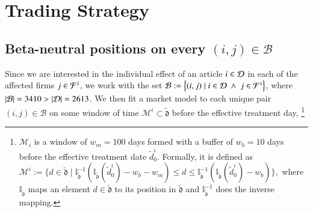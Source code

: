 \section{Trading Strategy}

\subsection{Beta-neutral positions on every $(i,j)\in\mathcal B$}
Since we are interested in the individual effect of an article $i\in\mathcal{D}$ in each of the affected firms $j\in\mathcal{F}^i$, we work with the set
$
\mathcal{B}:=\left\{(i,j) \mid i\in \mathcal{D} ~\wedge~j\in \mathcal{F}^i \right\}
$, where $\left|\mathcal{B}\right|=3410>\left|\mathcal{D}\right|=2613$. 
We then fit a market model to each unique pair $(i,j)\in \mathcal{B}$
on some window of time $\mathcal{M}^i\subset \tilde{\mathfrak{d}}$ before the effective treatment day,%
\footnote{$\mathcal M_i$ is a window of $w_m=100$ days formed with a buffer of $w_b=10$ days  before the effective treatment date $\tilde d_0^i$. Formally, it is defined as   
$
\mathcal{M}^i := 
\{
d\in \tilde{\mathfrak{d}}
\mid 
\mathbb{I}^{-1}_{\tilde{\mathfrak{d}}} 
(
\mathbb{I}_{\tilde{\mathfrak{d}}} (\tilde{d}_0^i) - {w}_b - {w}_m 
)
\leq d \leq 
\mathbb{I}^{-1}_{\tilde{\mathfrak{d}}} 
(
\mathbb{I}_{\tilde{\mathfrak{d}}} (\tilde{d}_0^i) - {w}_b 
)
\}
,
$
where $\mathbb{I}_{\tilde{\mathfrak d}}$ maps an element $d\in\tilde{\mathfrak d}$ to its position in $\tilde{\mathfrak d}$ and $\mathbb{I}^{-1}_{\tilde{\mathfrak d}}$ does the inverse mapping. 
}
%
%
%
